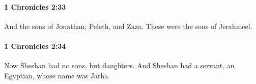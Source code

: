 		\paragraph{1 Chronicles 2:33} %
			\label{1CHRONICLES-2-33}

			And the sons of Jonathan; Peleth, and Zaza. These were the sons of Jerahmeel.


		\paragraph{1 Chronicles 2:34} %
			\label{1CHRONICLES-2-34}

			Now Sheshan had no sons, but daughters. And Sheshan had a servant, an Egyptian, whose name was Jarha.


